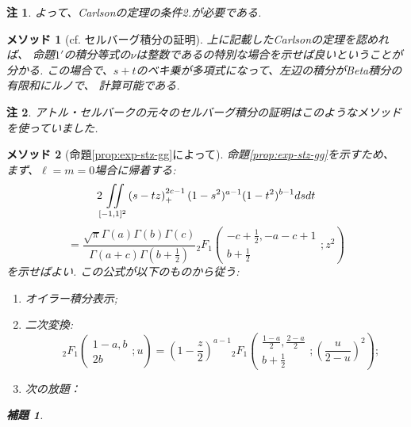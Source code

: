 \documentclass[12pt]{article} %
\newtheorem*{lemma*}{補題}
\newtheorem*{remark*}{\textbf{注}}
\newtheorem{method}{\textbf{メソッド}}
\theoremstyle{remark}
\begin{document}
{\begin{remark*}
	よって、Carlsonの定理の条件2.が必要である.
\end{remark*}
\begin{method}[cf. セルバーグ積分の証明]
	上に記載したCarlsonの定理を認めれば、
命題$1'$の積分等式の$\nu$は整数であるの特別な場合を示せば良いということが分かる.
この場合で、$s+t$のベキ乗が多項式になって、左辺の積分がBeta積分の有限和にルノで、
計算可能である.
\end{method}
\begin{remark*}
アトル・セルバークの元々のセルバーグ積分の証明はこのようなメソッドを使っていました.
\end{remark*}
\begin{method}[命題\ref{prop:exp-stz-gg}によって]
	命題\ref{prop:exp-stz-gg}を示すため、
まず、$\ell=m=0$場合に帰着する:
			\begin{equation*}
				 2\iint\displaylimits_{[-1,1]^2} \left( s-tz \right)_+^{2c-1}  (1 - s^2)^{a - 1} (1 -
				t^2)^{b - 1} d s d t
			\end{equation*}
			\begin{equation} =
				\frac{\sqrt{\pi} \Gamma (a) \Gamma (b) \Gamma
			(c)}{\Gamma (a + c) \Gamma \left( b + \frac{1}{2} \right)} {}_2 F_1 \left(
			\begin{array}{c}
				  - c + \frac{1}{2}, - a - c + 1\\
				    b + \frac{1}{2}
			    \end{array} ; z^2 \right)
				\label{eqn:prop21}
			\end{equation}
			を示せばよい.
	この公式が以下のものから従う:
	\begin{enumerate}
		\item オイラー積分表示;
		\item 二次変換:
			\begin{equation*}
			\quad {}_2 F_1 \left( \begin{array}{c}
				  1 - a, b\\
				    2 b
			    \end{array} ; u \right) = \left( 1 - \frac{z}{2} \right)^{a - 1} {}_2 F_1 \left(
			    \begin{array}{c}
				      \frac{1 - a}{2}, \frac{2 - a}{2}\\
					b + \frac{1}{2}
				\end{array} ; \left( \frac{u}{2 - u} \right)^2 \right);
			\end{equation*}
		\item 次の放題：
	\end{enumerate}
			\begin{lemma*}
				

\end{lemma*}
\end{method}}
\end{document}
